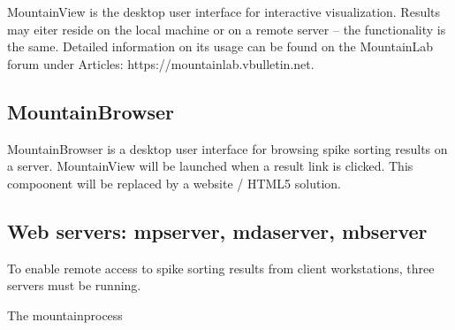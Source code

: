 \documentclass{article}
\begin{document}
MountainView is the desktop user interface for interactive visualization. Results may eiter reside on the local machine or on a remote server -- the functionality is the same. Detailed information on its usage can be found on the MountainLab forum under Articles: https://mountainlab.vbulletin.net.

\subsection{MountainBrowser}

MountainBrowser is a desktop user interface for browsing spike sorting results on a server. MountainView will be launched when a result link is clicked. This compoonent will be replaced by a website / HTML5 solution.

\subsection{Web servers: mpserver, mdaserver, mbserver}

To enable remote access to spike sorting results from client workstations, three servers must be running. 

The mountainprocess
\end{document}
